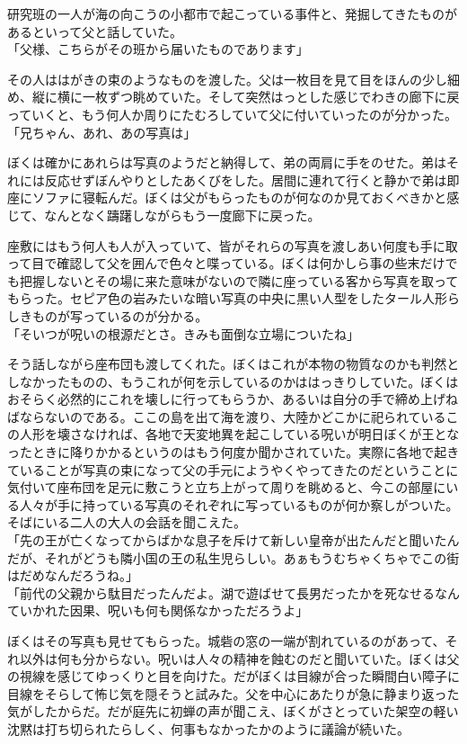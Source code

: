 \documentclass[b5j,twoside,twocolumn]{utarticle}
\begin{document}
研究班の一人が海の向こうの小都市で起こっている事件と、発掘してきたものがあるといって父と話していた。\\
「父様、こちらがその班から届いたものであります」


その人ははがきの束のようなものを渡した。父は一枚目を見て目をほんの少し細め、縦に横に一枚ずつ眺めていた。そして突然はっとした感じでわきの廊下に戻っていくと、もう何人か周りにたむろしていて父に付いていったのが分かった。\\
「兄ちゃん、あれ、あの写真は」


ぼくは確かにあれらは写真のようだと納得して、弟の両肩に手をのせた。弟はそれには反応せずぼんやりとしたあくびをした。居間に連れて行くと静かで弟は即座にソファに寝転んだ。ぼくは父がもらったものが何なのか見ておくべきかと感じて、なんとなく躊躇しながらもう一度廊下に戻った。


座敷にはもう何人も人が入っていて、皆がそれらの写真を渡しあい何度も手に取って目で確認して父を囲んで色々と喋っている。ぼくは何かしら事の些末だけでも把握しないとその場に来た意味がないので隣に座っている客から写真を取ってもらった。セピア色の岩みたいな暗い写真の中央に黒い人型をしたタール人形らしきものが写っているのが分かる。\\
「そいつが呪いの根源だとさ。きみも面倒な立場についたね」


そう話しながら座布団も渡してくれた。ぼくはこれが本物の物質なのかも判然としなかったものの、もうこれが何を示しているのかははっきりしていた。ぼくはおそらく必然的にこれを壊しに行ってもらうか、あるいは自分の手で締め上げねばならないのである。ここの島を出て海を渡り、大陸かどこかに祀られているこの人形を壊さなければ、各地で天変地異を起こしている呪いが明日ぼくが王となったときに降りかかるというのはもう何度か聞かされていた。実際に各地で起きていることが写真の束になって父の手元にようやくやってきたのだということに気付いて座布団を足元に敷こうと立ち上がって周りを眺めると、今この部屋にいる人々が手に持っている写真のそれぞれに写っているものが何か察しがついた。そばにいる二人の大人の会話を聞こえた。\\
「先の王が亡くなってからばかな息子を斥けて新しい皇帝が出たんだと聞いたんだが、それがどうも隣小国の王の私生児らしい。あぁもうむちゃくちゃでこの街はだめなんだろうね。」\\
「前代の父親から駄目だったんだよ。湖で遊ばせて長男だったかを死なせるなんていかれた因果、呪いも何も関係なかっただろうよ」


ぼくはその写真も見せてもらった。城砦の窓の一端が割れているのがあって、それ以外は何も分からない。呪いは人々の精神を蝕むのだと聞いていた。ぼくは父の視線を感じてゆっくりと目を向けた。だがぼくは目線が合った瞬間白い障子に目線をそらして怖じ気を隠そうと試みた。父を中心にあたりが急に静まり返った気がしたからだ。だが庭先に初蝉の声が聞こえ、ぼくがさとっていた架空の軽い沈黙は打ち切られたらしく、何事もなかったかのように議論が続いた。
\end{document}
